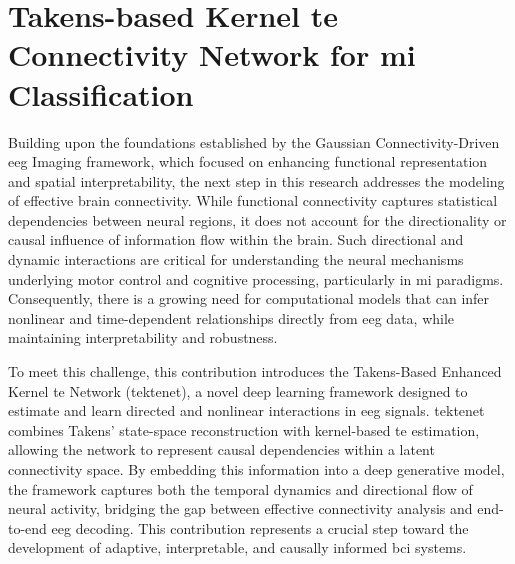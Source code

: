 \chapter[Takens-based Kernel \gls{te} Connectivity Network for \gls{mi} Classification]{Takens-based Kernel \gls{te} Connectivity Network for
\gls{mi} Classification}\label{chapter_2} 


\noindent{}

Building upon the foundations established by the Gaussian Connectivity-Driven \gls{eeg} Imaging framework, which focused on enhancing functional representation and spatial interpretability, the next step in this research addresses the modeling of effective brain connectivity. While functional connectivity captures statistical dependencies between neural regions, it does not account for the directionality or causal influence of information flow within the brain. Such directional and dynamic interactions are critical for understanding the neural mechanisms underlying motor control and cognitive processing, particularly in \gls{mi} paradigms. Consequently, there is a growing need for computational models that can infer nonlinear and time-dependent relationships directly from \gls{eeg} data, while maintaining interpretability and robustness.

To meet this challenge, {this contribution} introduces the Takens-Based Enhanced Kernel \gls{te}  Network (\gls{tektenet}), a novel deep learning framework designed to estimate and learn directed and nonlinear interactions in \gls{eeg} signals. \gls{tektenet} combines Takens' state-space reconstruction with kernel-based \gls{te}  estimation, allowing the network to represent causal dependencies within a latent connectivity space. By embedding this information into a deep generative model, the framework captures both the temporal dynamics and directional flow of neural activity, bridging the gap between effective connectivity analysis and end-to-end \gls{eeg} decoding. This contribution represents a crucial step toward the development of adaptive, interpretable, and causally informed \gls{bci} systems.

